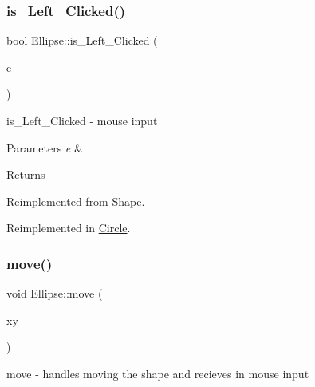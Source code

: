 \mbox{\label{class_ellipse_ab3ba6c9f068fc37808778c74f1273f69}} 
\subsubsection{\texorpdfstring{is\+\_\+\+Left\+\_\+\+Clicked()}{is\_Left\_Clicked()}}
{\footnotesize\ttfamily bool Ellipse\+::is\+\_\+\+Left\+\_\+\+Clicked (\begin{DoxyParamCaption}\item[{Q\+Point}]{e }\end{DoxyParamCaption})\hspace{0.3cm}{\ttfamily [virtual]}}



is\+\_\+\+Left\+\_\+\+Clicked -\/ mouse input 


\begin{DoxyParams}{Parameters}
{\em e} & \\
\hline
\end{DoxyParams}
\begin{DoxyReturn}{Returns}

\end{DoxyReturn}


Reimplemented from \hyperlink{class_shape_ab2d47c913eb287843e61b2d48e422ced}{Shape}.



Reimplemented in \hyperlink{class_circle_a1661bb4e324cce0196a6aa1195c26c73}{Circle}.

\mbox{\label{class_ellipse_a8f5c5a4d8051009fee6d861f163c96dd}} 
\subsubsection{\texorpdfstring{move()}{move()}}
{\footnotesize\ttfamily void Ellipse\+::move (\begin{DoxyParamCaption}\item[{Q\+Point}]{xy }\end{DoxyParamCaption})\hspace{0.3cm}{\ttfamily [virtual]}}



move -\/ handles moving the shape and recieves in mouse input 


